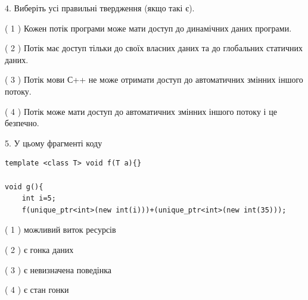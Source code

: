 \documentclass[12pt, ukrainian]{article}
\begin{document}
\begin {large}
{%
4. Виберіть усі правильні твердження (якщо такі є).\par
\vspace{2mm}

( 1 ) Кожен потік програми може мати доступ до динамічних даних програми.%

( 2 ) Потік має доступ тільки до своїх власних даних та до глобальних статичних даних.%

( 3 ) Потік мови С++ не може отримати доступ до автоматичних змінних іншого потоку.%

( 4 ) Потік може мати доступ до автоматичних змінних іншого потоку і це безпечно.%


5. У цьому фрагменті коду
\begin{verbatim}
template <class T> void f(T a){}

void g(){
    int i=5;
    f(unique_ptr<int>(new int(i)))+(unique_ptr<int>(new int(35)));
\end{verbatim}
( 1 ) можливий виток ресурсів%

( 2 ) є гонка даних%

( 3 ) є невизначена поведінка%

( 4 ) є стан гонки%
}
\end {large}
\end{document}
